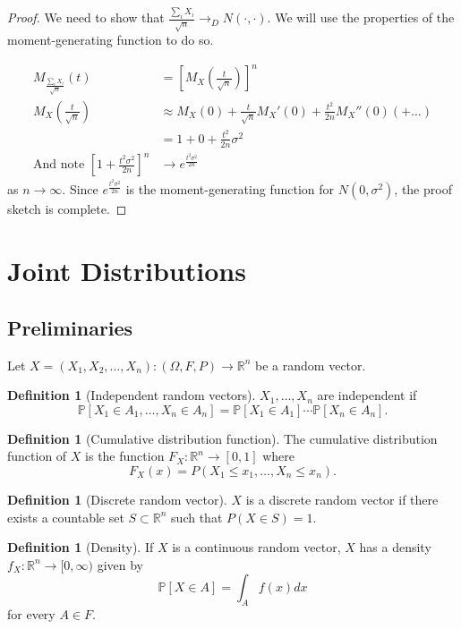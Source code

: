 \documentclass{tufte-handout}
\newcommand*\R{\mathbb{R}}
\renewcommand{\P}{\mathbb{P}}
\theoremstyle{definition}
\newtheorem{defn}[thm]{Definition}
\begin{document}
\begin{proof}
	We need to show that $\frac{\sum_{i}^{} X_i}{\sqrt{n} } \to_D N(\cdot, \cdot)$. We will use the properties of the moment-generating function to do so.

	\begin{align*}
		M_{\frac{\sum_{i}^{} X_i}{\sqrt{n} }}(t) &= \left[ M_X \left( \frac{t}{\sqrt{n} } \right) \right] ^{n} \\
		M_X \left( \frac{t}{\sqrt{n} } \right) &\approx M_X(0) + \frac{t}{\sqrt{n} } M_X'(0) + \frac{t^2}{2n}M_X''(0) (+ \ldots) \\
		&= 1 + 0 + \frac{t^2}{2n}\sigma^2 \\
		\text{And note }\left[ 1 + \frac{t^2 \sigma^2}{2n} \right]^{n} &\to e^{\frac{t^2\sigma^2}{2n}}
	\end{align*}
	as $n\to \infty$. Since $e^{\frac{t^2\sigma^2}{2n}}$ is the moment-generating function for $N(0, \sigma^2)$, the proof sketch is complete.
\end{proof}

\section{Joint Distributions}

\subsection{Preliminaries}
Let $X = (X_1,X_2,\ldots,X_n): \left( \Omega, F, P \right) \to \R^n$ be a random vector.

\begin{defn}[Independent random vectors]
	$X_1,\ldots,X_n$ are independent if \[
		\P\left[X_1 \in A_1,\ldots,X_n \in A_n\right] = \P\left[X_1 \in A_1\right] \cdots \P\left[X_n \in A_n\right] 
	.\] 
\end{defn}

\begin{defn}[Cumulative distribution function]
	The cumulative distribution function of $X$ is the function $F_X: \R^n \to [0,1]$ where \[
		F_X(x) = P(X_1 \le x_1, \ldots,X_n \le x_n)
	.\] 
\end{defn}

\begin{defn}[Discrete random vector]
	$X$ is a discrete random vector if there exists a countable set $S \subset \R^n$ such that $P(X \in S) = 1$.
\end{defn}

\begin{defn}[Density]
	If $X$ is a continuous random vector, $X$ has a density $f_X: \R^n \to [0,\infty)$ given by \[
		\P\left[X \in A\right] = \int_{A}^{} f(x)dx 
	\] for every $A \in F$.
\end{defn}
\end{document}
